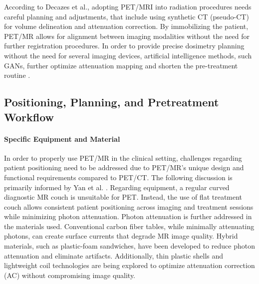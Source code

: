 \begin{multicols}{2}

According to Decazes et al., adopting PET/MRI into radiation procedures needs careful planning and adjustments, that include using synthetic CT (pseudo-CT) for volume delineation and attenuation correction. %
By immobilizing the patient, PET/MR allows for alignment between imaging modalities without the need for further registration procedures. In order to provide precise dosimetry planning without the need for several imaging devices, artificial intelligence methods, such GANs, further optimize attenuation mapping and shorten the pre-treatment routine \cite{decazes2021}.


\subsection{Positioning, Planning, and Pretreatment Workflow}

\paragraph{Specific Equipment and Material}
In order to properly use PET/MR in the clinical setting, challenges regarding patient positioning need to be addressed due to PET/MR's  %
unique design and functional requirements compared to PET/CT. The following discussion is primarily informed by Yan et al. \cite{yan2024}.%
Regarding equipment, a regular curved diagnostic MR couch is unsuitable for PET. Instead, the use of flat treatment couch allows consistent patient positioning across imaging and treatment sessions while minimizing photon attenuation. Photon attenuation is further addressed in the materials used. Conventional carbon fiber tables, while minimally attenuating photons, can create surface currents that degrade MR image quality. Hybrid materials, such as plastic-foam sandwiches, have been developed to reduce photon attenuation and eliminate artifacts. Additionally, thin plastic shells and lightweight coil technologies are being explored to optimize attenuation correction (AC) without compromising image quality. \cite{yan2024, ziegler2013}


\end{multicols}
